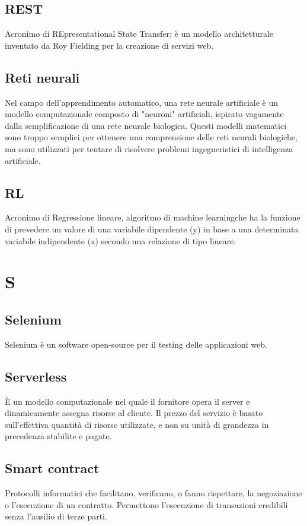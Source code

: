 \subsection*{REST}
Acronimo di REpresentational State Transfer; è un modello architetturale inventato da Roy Fielding per la creazione di servizi web.

\subsection*{Reti neurali}
Nel campo dell'apprendimento automatico, una rete neurale artificiale  è un modello computazionale composto di "neuroni" artificiali, ispirato vagamente dalla semplificazione di una rete neurale biologica. Questi modelli matematici sono troppo semplici per ottenere una comprensione delle reti neurali biologiche, ma sono utilizzati per tentare di risolvere problemi ingegneristici di intelligenza artificiale.

\subsection*{RL}
Acronimo di Regressione lineare, algoritmo di machine learning\glosp che ha la funzione di prevedere un valore di una variabile dipendente (y) in base a una determinata variabile indipendente (x) secondo una relazione di tipo lineare.

\clearpage
\section*{S}

\subsection*{Selenium}
Selenium è un software open-source per il testing delle applicazioni web.

\subsection*{Serverless}
È un modello computazionale nel quale il fornitore opera il server e dinamicamente assegna risorse al cliente. Il prezzo del servizio è basato sull'effettiva quantità di risorse utilizzate, e non su unità di grandezza in precedenza stabilite e pagate.

\subsection*{Smart contract}
Protocolli informatici che facilitano, verificano, o fanno rispettare, la negoziazione o l'esecuzione di un contratto. Permettono l'esecuzione di transazioni credibili senza l'ausilio di terze parti.

